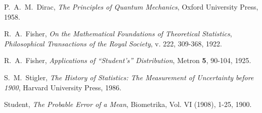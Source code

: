 
\begin{thebibliography}{90}


 P.~A.~M.~Dirac,
    {\it The Principles of Quantum Mechanics},
    Oxford University Press, 1958.

 R.~A.~Fisher,
    {\it On the Mathematical Foundations of Theoretical Statistics},
    {\it Philosophical Transactions of the Royal Society},  v. 222, 309-368, 1922.

 R.~A.~Fisher,
    {\it Applications of ``Student's'' Distribution}, Metron {\bf 5}, 90-104, 1925.

  S.~M.~Stigler,
    {\it The History of  Statistics: The Measurement of Uncertainty before 1900},
    Harvard University Press, 1986.

 Student,
    {\it The Probable Error of a Mean},
Biometrika,  Vol. VI (1908), 1-25, 1900.

\end{thebibliography}

\small
